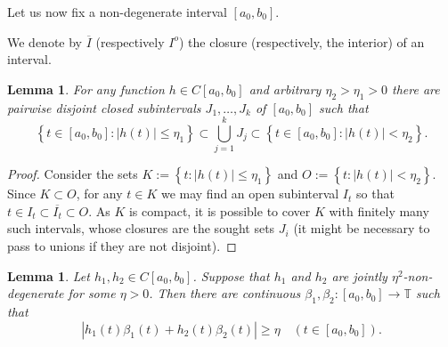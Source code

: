 \documentclass[12pt,fleqn]{amsart}
\newtheorem{lemma}[theorem]{Lemma}
\theoremstyle{definition}
\numberwithin{equation}{section}
\theoremstyle{remark}
\begin{document}
Let us now fix a non-degenerate interval $\left[a_{0}, b_{0}\right]$.

We denote by $\overline{I}$ (respectively $I^{o}$) the closure (respectively, the interior) of an interval.

\begin{lemma}\label{l4.8}
   For any function $h\in C[a_{0}, b_{0}]$ and arbitrary $\eta_{2}>\eta_{1}>0$ there are pairwise disjoint closed subintervals $J_{1}, \ldots, J_{k}$ of $\left[a_{0}, b_{0}\right]$ such that
    \[
    \left\{t\in [a_{0}, b_{0}] \colon |h(t)| \leqslant \eta_{1}\right\} \subset \bigcup_{j=1}^k J_j \subset\left\{t \in [a_{0}, b_{0}]\colon |h(t)|<\eta_{2}\right\}.
    \]
\end{lemma}

\begin{proof}
    Consider the sets $K:=\left\{t \colon |h(t)| \leqslant \eta_{1}\right\}$ and $O:=\left\{t \colon |h(t)|<\eta_{2}\right\}$. Since $K \subset O$, for any $t \in K$ we may find an open subinterval $I_{t}$ so that $t \in I_{t} \subset \overline{I_{t}} \subset O.$ As $K$ is compact, it is possible to cover $K$ with finitely many such intervals, whose closures are the sought sets $J_i$ (it might be necessary to pass to unions if they are not disjoint).
\end{proof}

\begin{lemma}
    Let $h_{1}, h_{2}\in C\left[a_{0}, b_{0}\right]$. Suppose that $h_1$ and $h_2$ are jointly $\eta^2$-non-degenerate for some $\eta >0 $. Then there are continuous $\beta_{1}, \beta_{2}\colon \left[a_{0}, b_{0}\right] \rightarrow \mathbb{T}$ such that 
    \[
        \left|h_{1}(t) \beta_{1}(t)+h_{2}(t) \beta_{2}(t)\right| \geqslant \eta\quad (t \in\left[a_{0}, b_{0}\right]).
    \]
\end{lemma}
\end{document}
